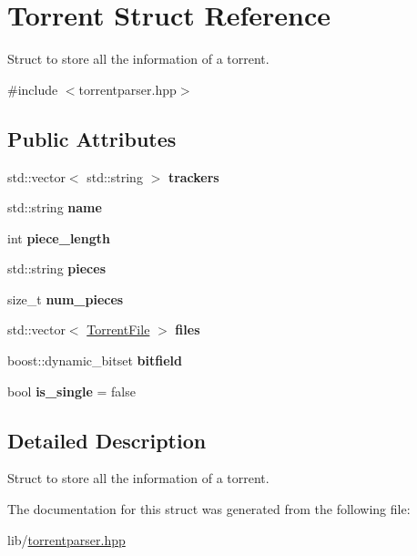 \hypertarget{structTorrent}{}\section{Torrent Struct Reference}
\label{structTorrent}


Struct to store all the information of a torrent.  




{\ttfamily \#include $<$torrentparser.\+hpp$>$}

\subsection*{Public Attributes}
\begin{DoxyCompactItemize}
\item 
\mbox{\label{structTorrent_a634e08dc5c95e76117074acb5f633a90}} 
std\+::vector$<$ std\+::string $>$ {\bfseries trackers}
\item 
\mbox{\label{structTorrent_af0f3f1ae144a53edfd6f526abe35911a}} 
std\+::string {\bfseries name}
\item 
\mbox{\label{structTorrent_af35506b5ff7dfa2479dfafa5db46ccb7}} 
int {\bfseries piece\+\_\+length}
\item 
\mbox{\label{structTorrent_adf5e9b81258493066f0649348fec1383}} 
std\+::string {\bfseries pieces}
\item 
\mbox{\label{structTorrent_a3f559e759bb388621ed3ca287e0dce4b}} 
size\+\_\+t {\bfseries num\+\_\+pieces}
\item 
\mbox{\label{structTorrent_a3cf53601cc00765215995fc7f093e5cd}} 
std\+::vector$<$ \hyperlink{structTorrentFile}{Torrent\+File} $>$ {\bfseries files}
\item 
\mbox{\label{structTorrent_a8c811cd46d8935b7c25f00c9819463c2}} 
boost\+::dynamic\+\_\+bitset {\bfseries bitfield}
\item 
\mbox{\label{structTorrent_a9745fb134056ea76dc14cdbd11b58f3e}} 
bool {\bfseries is\+\_\+single} = false
\end{DoxyCompactItemize}


\subsection{Detailed Description}
Struct to store all the information of a torrent. 

The documentation for this struct was generated from the following file\+:\begin{DoxyCompactItemize}
\item 
lib/\hyperlink{torrentparser_8hpp}{torrentparser.\+hpp}\end{DoxyCompactItemize}
